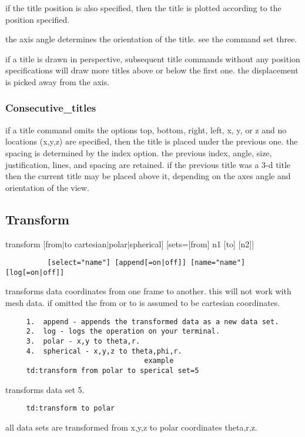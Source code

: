if  the  title  position  is  also specified, then the title is plotted
according to the position specified.  

the  axis  angle  determines  the  orientation  of  the title.  see the
command set three.  

if  a  title is drawn in perspective, subsequent title commands without
any position specifications will draw more titles above  or  below  the
first one.  the displacement is picked away from the axis.  
\subsubsection{Consecutive\_titles}
if a title command omits the options top, bottom, right, left, x, y, or
z and no locations (x,y,z) are specified,  then  the  title  is  placed
under the previous one.  the spacing is determined by the index option.
the previous index, angle, size, justification, lines, and spacing  are
retained.  if the previous title was a 3-d title then the current title
may be placed above it, depending on the axes angle and orientation  of
the view.  
\subsection{Transform}
transform [from$|$to cartesian$|$polar$|$spherical] [sets=[from] n1 [to] [n2]]
\begin{verbatim}
          [select="name"] [append[=on|off]] [name="name"] [log[=on|off]] 
\end{verbatim}
transforms  data  coordinates  from  one frame to another.  this will not
work with mesh data.  if  omitted  the  from  or  to  is  assumed  to  be
cartesian coordinates.  
\begin{verbatim}
     1.  append - appends the transformed data as a new data set.  
     2.  log - logs the operation on your terminal.  
     3.  polar - x,y to theta,r.  
     4.  spherical - x,y,z to theta,phi,r.  
                                 example
     td:transform from polar to sperical set=5 
\end{verbatim}
transforms data set 5.  
\begin{verbatim}
     td:transform to polar 
\end{verbatim}
all data sets are transformed from x,y,z to polar coordinates theta,r,z. 

